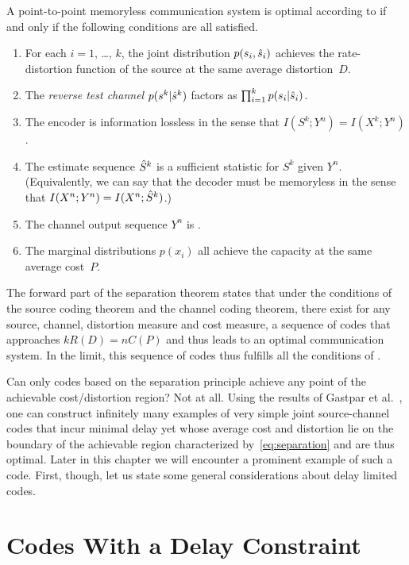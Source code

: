 \begin{theorem}
  \label{thm:optimalityconditions}
  A point-to-point memoryless communication system is optimal according to
   if and only if the following conditions are all satisfied.
  \begin{enumerate}
    \item For each $i = 1$, \dots, $k$, the joint distribution $p(s_i,{\hat{s}}_i)$
      achieves the rate-distortion function of the source at the same average
      distortion~$D$.
    \item The \emph{reverse test channel} $p(s^k|{\hat{s}}^k)$ factors as
      $\prod_{i=1}^k p(s_i | {\hat{s}}_i)$. 
    \item The encoder is information lossless in the sense that $I(S^k;Y^n) =
      I(X^k; Y^n)$. 
    \item The estimate sequence ${\hat{S}}^k$ is a sufficient statistic for $S^k$
      given $Y^n$. (Equivalently, we can say that the decoder must be memoryless
      in the sense that $I(X^n;Y^n) = I(X^n;{\hat{S}}^k)$.)
    \item The channel output sequence $Y^n$ is \iid.
    \item The marginal distributions $p(x_i)$ all achieve the capacity at the
      same average cost~$P$.
  \end{enumerate}
\end{theorem}

The forward part of the separation theorem states that under the
conditions of the source coding theorem and the channel coding theorem, there
exist for any source, channel, distortion measure and cost measure, a sequence
of codes that approaches $k R(D) = nC(P)$ and thus leads to an optimal
communication system. In the limit, this sequence of codes thus fulfills all the
conditions of .

Can only codes based on the separation principle achieve any point of the
achievable cost\slash distortion region? Not at all. Using the results of
Gastpar et al.~\cite{GastparRV2003}, one can construct infinitely many examples
of very simple joint source-channel codes that incur minimal delay yet whose
average cost and distortion lie on the boundary of the achievable region
characterized by~\eqref{eq:separation} and are thus optimal. Later
in this chapter we will encounter a prominent example of such a code. First,
though, let us state some general considerations about delay limited codes.


\section{Codes With a Delay Constraint}\label{sec:delayconstraint}

